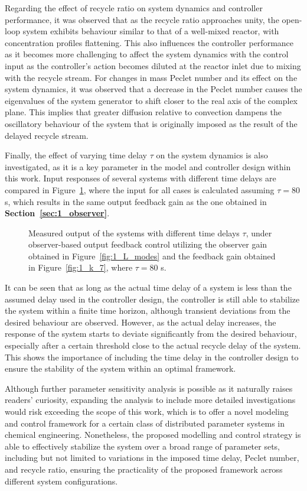 Regarding the effect of recycle ratio on system dynamics and controller performance, it was observed that as the recycle ratio approaches unity, the open-loop system exhibits behaviour similar to that of a well-mixed reactor, with concentration profiles flattening. This also influences the controller performance as it becomes more challenging to affect the system dynamics with the control input as the controller's action becomes diluted at the reactor inlet due to mixing with the recycle stream. For changes in mass Peclet number and its effect on the system dynamics, it was observed that a decrease in the Peclet number causes the eigenvalues of the system generator to shift closer to the real axis of the complex plane. This implies that greater diffusion relative to convection dampens the oscillatory behaviour of the system that is originally imposed as the result of the delayed recycle stream.

Finally, the effect of varying time delay $\tau$ on the system dynamics is also investigated, as it is a key parameter in the model and controller design within this work. Input responses of several systems with different time delays are compared in Figure~\ref{fig:1_tau_sensitivity}, where the input for all cases is calculated assuming $\tau = 80$ s, which results in the same output feedback gain as the one obtained in \textbf{Section~\ref{sec:1_observer}}.

\begin{figure}[!htbp]
    \centering
    
    \caption{Measured output of the systems with different time delays $\tau$, under observer-based output feedback control utilizing the observer gain obtained in Figure~\ref{fig:1_L_modes} and the feedback gain obtained in Figure~\ref{fig:1_k_7}, where $\tau = 80$ s.}
    \label{fig:1_tau_sensitivity}
\end{figure}

It can be seen that as long as the actual time delay of a system is less than the assumed delay used in the controller design, the controller is still able to stabilize the system within a finite time horizon, although transient deviations from the desired behaviour are observed. However, as the actual delay increases, the response of the system starts to deviate significantly from the desired behaviour, especially after a certain threshold close to the actual recycle delay of the system. This shows the importance of including the time delay in the controller design to ensure the stability of the system within an optimal framework.

Although further parameter sensitivity analysis is possible as it naturally raises readers' curiosity, expanding the analysis to include more detailed investigations would risk exceeding the scope of this work, which is to offer a novel modeling and control framework for a certain class of distributed parameter systems in chemical engineering. Nonetheless, the proposed modelling and control strategy is able to effectively stabilize the system over a broad range of parameter sets, including but not limited to variations in the imposed time delay, Peclet number, and recycle ratio, ensuring the practicality of the proposed framework across different system configurations.